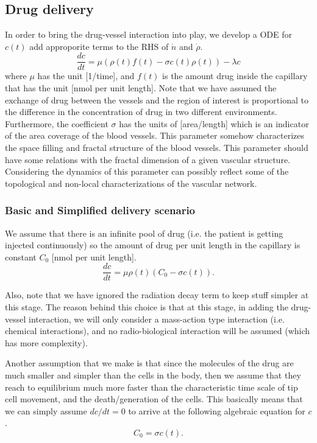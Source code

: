 \subsection*{Drug delivery}
In order to bring the drug-vessel interaction into play, we develop a ODE for $c(t)$ add approporite terms to the RHS of $\dot{n}$ and $\dot{\rho}$.
\[ \frac{dc}{dt} = \mu (\rho(t)f(t) - \sigma c(t)\rho(t)) - \boxed{\lambda c} \]
where $\mu$ has the unit [1/time], and $f(t)$ is the amount drug inside the capillary that has the unit [nmol per unit length]. Note that we have assumed the exchange of drug between the vessels and the region of interest is proportional to the difference in the concentration of drug in two different environments. Furthermore, the coefficient $\sigma$ has the units of [area/length] which is an indicator of the area coverage of the blood vessels. This parameter somehow characterizes the space filling and fractal structure of the blood vessels. This parameter should have some relations with the fractal dimension of a given vascular structure. Considering the dynamics of this parameter can possibly reflect some of the topological and non-local characterizations of the vascular network.



\subsubsection*{Basic and Simplified delivery scenario}
We assume that there is an infinite pool of drug (i.e. the patient is getting injected continuously) so the amount of drug per unit length in the capillary is constant $C_0$ [nmol per unit length].
\[ \frac{dc}{dt} = \mu \rho(t)(C_0 - \sigma c(t)).  \]

Also, note that we have ignored the radiation decay term to keep stuff simpler at this stage. The reason behind this choice is that at this stage, in adding the drug-vessel interaction, we will only consider a mass-action type interaction (i.e. chemical interactions), and no radio-biological interaction will be assumed (which has more complexity).

Another assumption that we make is that since the molecules of the drug are much smaller and simpler than the cells in the body, then we assume that they reach to equilibrium much more faster than the characteristic time scale of tip cell movement, and the death/generation of the cells. This basically means that we can simply assume $dc/dt=0$ to arrive at the following algebraic equation for $c$.
\[ C_0 = \sigma c(t). \]



